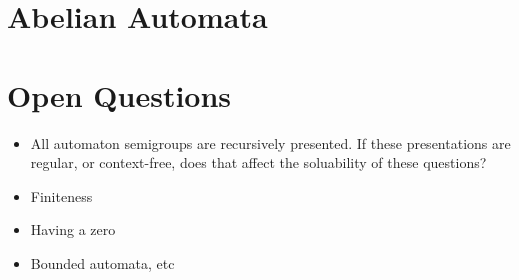 \documentclass[10pt]{article} %
\begin{document}

    \section{Abelian Automata}

    \section{Open Questions} 

    \begin{itemize}
    \item All automaton semigroups are recursively presented. If these presentations are regular, or context-free, does that affect the soluability of these questions?
    \item Finiteness
    \item Having a zero
    \item Bounded automata, etc
    \end{itemize}
    
    \nocite{*}
    
    
\end{document}

